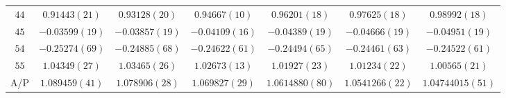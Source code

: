\begin{table}
\begin{center}
\begin{tabular}{c|c c c c c c}
$44$ & $0.91443(21)$ & $0.93128(20)$ & $0.94667(10)$ & $0.96201(18)$ & $0.97625(18)$ & $0.98992(18)$ \\
$45$ & $-0.03599(19)$ & $-0.03857(19)$ & $-0.04109(16)$ & $-0.04389(19)$ & $-0.04666(19)$ & $-0.04951(19)$ \\
$54$ & $-0.25274(69)$ & $-0.24885(68)$ & $-0.24622(61)$ & $-0.24494(65)$ & $-0.24461(63)$ & $-0.24522(61)$ \\
$55$ & $1.04349(27)$ & $1.03465(26)$ & $1.02673(13)$ & $1.01927(23)$ & $1.01234(22)$ & $1.00565(21)$ \\
\hline
A/P & $1.089459(41)$ & $1.078906(28)$ & $1.069827(29)$ & $1.0614880(80)$ & $1.0541266(22)$ & $1.04744015(51)$ \\
\hline
\hline
\end{tabular}
\end{center}
\end{table}